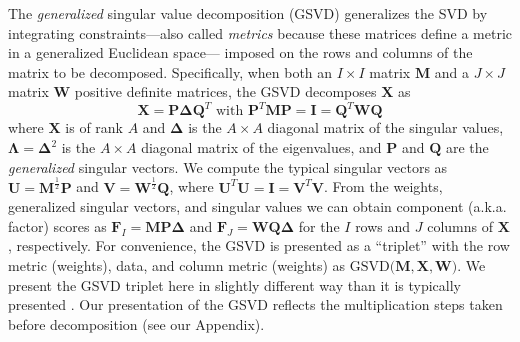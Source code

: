 \documentclass[12pt]{article}
\begin{document}
The \emph{generalized} singular value decomposition (GSVD) generalizes
the SVD by integrating constraints---also called \emph{metrics} because
these matrices define a metric in a generalized Euclidean space---
imposed on the rows and columns of the matrix to be decomposed.
Specifically, when both an \(I\times I\) matrix \({\mathbf M}\) and a
\(J\times J\) matrix \({\mathbf W}\) positive definite matrices, the
GSVD decomposes \({\mathbf X}\) as \begin{equation}\label{eq:gsvd}
{\mathbf X} = {\mathbf P}{\boldsymbol \Delta} {\mathbf Q}^{T} 
\textrm{ with }
{\mathbf P}^{T}{\mathbf M}{\mathbf P} = {\mathbf I} = {\mathbf Q}^{T}{\mathbf W}{\mathbf Q}
\end{equation} where \({\mathbf X}\) is of rank \(A\) and
\({\boldsymbol \Delta}\) is the \(A \times A\) diagonal matrix of the
singular values, \({\boldsymbol \Lambda} = {\boldsymbol \Delta}^2\) is
the \(A \times A\) diagonal matrix of the eigenvalues, and
\({\mathbf P}\) and \({\mathbf Q}\) are the \emph{generalized} singular
vectors. We compute the typical singular vectors as
\({\mathbf U} = {\mathbf M}^{\frac{1}{2}}{\mathbf P}\) and
\({\mathbf V} = {\mathbf W}^{\frac{1}{2}}{\mathbf Q}\), where
\({\mathbf U}^{T}{\mathbf U} = {\mathbf I} = {\mathbf V}^{T}{\mathbf V}\).
From the weights, generalized singular vectors, and singular values we
can obtain component (a.k.a. factor) scores as
\({\mathbf F}_{I} = {\mathbf M}{\mathbf P}{\boldsymbol \Delta}\) and
\({\mathbf F}_{J} = {\mathbf W}{\mathbf Q}{\boldsymbol \Delta}\) for the
\(I\) rows and \(J\) columns of \({\mathbf X}\), respectively. For
convenience, the GSVD is presented as a ``triplet'' with the row metric
(weights), data, and column metric (weights) as
\(\mathrm{GSVD(}{\mathbf M}, {\mathbf X}, {\mathbf W}\mathrm{)}\). We
present the GSVD triplet here in slightly different way than it is
typically presented \citep[see, e.g.,][]{holmes_multivariate_2008}. Our
presentation of the GSVD reflects the multiplication steps taken before
decomposition (see our Appendix).
\end{document}
